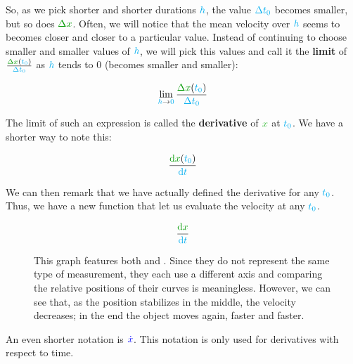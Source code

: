 So, as we pick shorter and shorter durations $\textcolor{cyan}{h}$, the value
$\textcolor{cyan}{\Delta t_0}$ becomes smaller, but so does $\dist{\Delta
x}$. Often, we will notice that the mean velocity over $\textcolor{cyan}{h}$
seems to becomes closer and closer to a particular value. Instead of
continuing to choose smaller and smaller values of $\textcolor{cyan}{h}$, we will
pick this values and call it the \textbf{limit} of $\frac {\dist{\Delta
x}(\delay{t_0})} {\delay{\Delta t_0}}$ as $\textcolor{cyan}{h}$ tends to $0$
(becomes smaller and smaller):

\[
\lim_{\delay{h} \to \delay{0}} \frac {\dist{\Delta x}(\delay{t_0})} {\delay{\Delta t_0}}
\]

The limit of such an expression is called the \textbf{derivative} of
$\posit{x}$ at $\textcolor{cyan}{t_0}$. We have a shorter way to note this:

\[
\frac {\dist{\d x}(\delay{t_0})} {\delay{\dt}}
\]

We can then remark that we have actually defined the derivative for any
$\textcolor{cyan}{t_0}$. Thus, we have a new function that let us evaluate the
velocity at any $\textcolor{cyan}{t_0}$.

\[
\frac {\dist{\d x}} {\delay{\dt}}
\]

\begin{figure}[H]
\centering
{}
\caption{
	This graph features both  and
	. Since they do not represent the same type of
	measurement, they each use a different axis and comparing the
	relative positions of their curves is meaningless. However, we can
	see that, as the position stabilizes in the middle, the velocity
	decreases; in the end the object moves again, faster and faster.
}
\end{figure}

\begin{remark}
An even shorter notation is $\textcolor{blue}{\dot x}$. This notation is only used
for derivatives with respect to time.
\end{remark}



